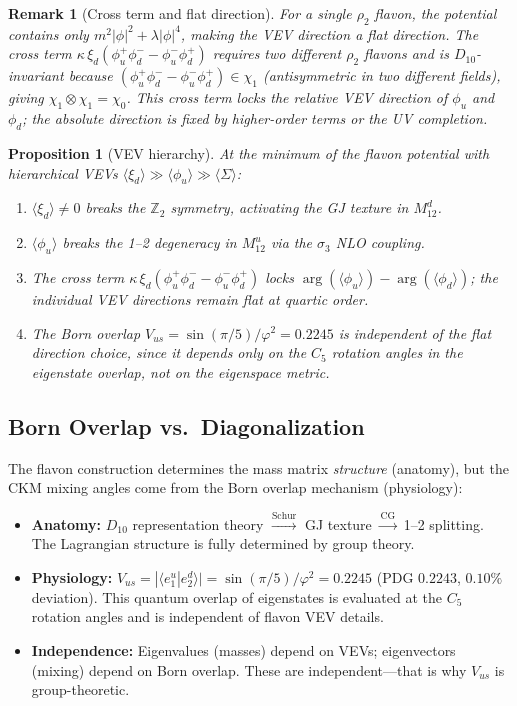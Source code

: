 \documentclass[11pt,a4paper]{article}
\newtheorem{proposition}[theorem]{Proposition}
\newtheorem{remark}[theorem]{Remark}
\begin{document}
\begin{remark}[Cross term and flat direction]
For a single $\rho_2$ flavon, the potential contains only $m^2|\phi|^2 + \lambda|\phi|^4$, making the VEV direction a flat direction. The cross term $\kappa \, \xi_d (\phi_u^+ \phi_d^- - \phi_u^- \phi_d^+)$ requires two different $\rho_2$ flavons and is $D_{10}$-invariant because $(\phi_u^+ \phi_d^- - \phi_u^- \phi_d^+) \in \chi_1$ (antisymmetric in two different fields), giving $\chi_1 \otimes \chi_1 = \chi_0$. This cross term locks the \emph{relative} VEV direction of $\phi_u$ and $\phi_d$; the absolute direction is fixed by higher-order terms or the UV completion.
\end{remark}

\begin{proposition}[VEV hierarchy]
At the minimum of the flavon potential with hierarchical VEVs $\langle\xi_d\rangle \gg \langle\phi_u\rangle \gg \langle\Sigma\rangle$:
\begin{enumerate}
\item $\langle\xi_d\rangle \neq 0$ breaks the $\mathbb{Z}_2$ symmetry, activating the GJ texture in $M^d_{12}$.
\item $\langle\phi_u\rangle$ breaks the 1--2 degeneracy in $M^u_{12}$ via the $\sigma_3$ NLO coupling.
\item The cross term $\kappa\,\xi_d(\phi_u^+\phi_d^- - \phi_u^-\phi_d^+)$ locks $\arg(\langle\phi_u\rangle) - \arg(\langle\phi_d\rangle)$; the individual VEV directions remain flat at quartic order.
\item The Born overlap $V_{us} = \sin(\pi/5)/\varphi^2 = 0.2245$ is independent of the flat direction choice, since it depends only on the $C_5$ rotation angles in the eigenstate overlap, not on the eigenspace metric.
\end{enumerate}
\end{proposition}

\subsection{Born Overlap vs.\ Diagonalization}

The flavon construction determines the mass matrix \emph{structure} (anatomy), but the CKM mixing angles come from the Born overlap mechanism (physiology):
\begin{itemize}
\item \textbf{Anatomy:} $D_{10}$ representation theory $\xrightarrow{\text{Schur}}$ GJ texture $\xrightarrow{\text{CG}}$ 1--2 splitting. The Lagrangian structure is fully determined by group theory.
\item \textbf{Physiology:} $V_{us} = |\langle e^u_1 | e^d_2\rangle| = \sin(\pi/5)/\varphi^2 = 0.2245$ (PDG $0.2243$, $0.10\%$ deviation). This quantum overlap of eigenstates is evaluated at the $C_5$ rotation angles and is independent of flavon VEV details.
\item \textbf{Independence:} Eigenvalues (masses) depend on VEVs; eigenvectors (mixing) depend on Born overlap. These are independent---that is why $V_{us}$ is group-theoretic.
\end{itemize}
\end{document}
